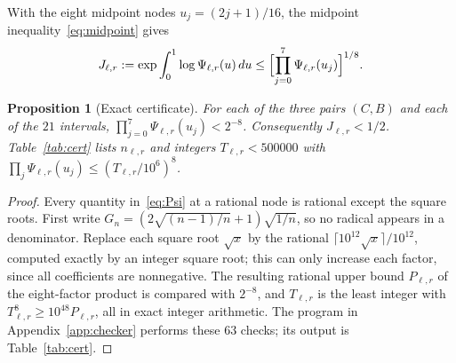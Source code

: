 \documentclass[11pt,a4paper]{article}
\newtheorem{proposition}[theorem]{Proposition}
\theoremstyle{definition}
\theoremstyle{remark}
\newcommand{\1}{\mathbf 1}
\begin{document}
With the eight midpoint nodes $u_j=(2j+1)/16$, the midpoint
inequality~\eqref{eq:midpoint} gives
\begin{equation}\label{eq:Jlr}
 J_{\ell,r}:=\exp\int_0^1\log\Psi_{\ell,r}(u)\,du
 \le\Bigl[\prod_{j=0}^7\Psi_{\ell,r}(u_j)\Bigr]^{1/8}.
\end{equation}

\begin{proposition}[Exact certificate]\label{prop:cert}
For each of the three pairs $(C,B)$ and each of the $21$ intervals,
$\prod_{j=0}^7\Psi_{\ell,r}(u_j)<2^{-8}$. Consequently
$J_{\ell,r}<1/2$. Table~\ref{tab:cert} lists $n_{\ell,r}$ and integers
$T_{\ell,r}<500000$ with
$\prod_j\Psi_{\ell,r}(u_j)\le(T_{\ell,r}/10^6)^8$.
\end{proposition}
\begin{proof}
Every quantity in~\eqref{eq:Psi} at a rational node is rational except
the square roots. First write
$G_n=(2\sqrt{(n-1)/n}+1)\sqrt{1/n}$, so no radical appears in a
denominator. Replace each square root $\sqrt x$ by the rational
$\lceil10^{12}\sqrt x\rceil/10^{12}$, computed exactly by an integer
square root; this can only increase each factor, since all coefficients
are nonnegative. The resulting rational upper bound $P_{\ell,r}$ of the
eight-factor product is compared with $2^{-8}$, and $T_{\ell,r}$ is the
least integer with $T_{\ell,r}^8\ge10^{48}P_{\ell,r}$, all in exact
integer arithmetic. The program in Appendix~\ref{app:checker} performs
these $63$ checks; its output is Table~\ref{tab:cert}.
\end{proof}
\end{document}

